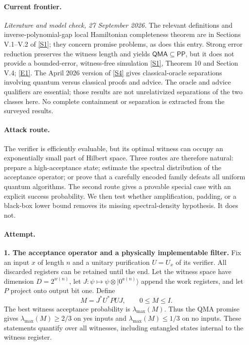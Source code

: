 \documentclass[11pt,a4paper]{article}
\newcommand{\sref}[2]{\hyperlink{source:#1:#2}{[S#2]}}
\newcommand{\eref}[2]{\hyperlink{extra:#1:#2}{[E#2]}}
\numberwithin{equation}{section}
\begin{document}
\paragraph{Current frontier.}
\textit{Literature and model check, 27 September 2026.}
The relevant definitions and inverse-polynomial-gap local Hamiltonian
completeness theorem are in Sections V.1--V.2 of \sref{30006695}{1}; they concern
promise problems, as does this entry. Strong error reduction preserves the
witness length and yields $\mathsf{QMA}\subseteq\mathsf{PP}$, but it does
not provide a bounded-error, witness-free simulation
\sref{30006695}{1}, Theorem 10 and Section V.4; \eref{30006695}{1}.
The April 2026 version of \sref{30006695}{4} gives classical-oracle separations
involving quantum versus classical proofs and advice. The oracle and advice
qualifiers are essential; those results are not unrelativized separations
of the two classes here. No complete containment or separation is extracted
from the surveyed results.

\paragraph{Attack route.}
The verifier is efficiently evaluable, but its optimal witness can occupy
an exponentially small part of Hilbert space. Three routes are therefore
natural: prepare a high-acceptance state; estimate the spectral distribution
of the acceptance operator; or prove that a carefully encoded family defeats
all uniform quantum algorithms. The second route gives a provable special
case with an explicit success probability. We then test whether amplification,
padding, or a black-box lower bound removes its missing spectral-density
hypothesis. It does not.

\paragraph{Attempt.}
\textbf{1. The acceptance operator and a physically implementable filter.}
Fix an input $x$ of length $n$ and a unitary purification $U=U_x$ of its
verifier. All discarded registers can be retained until the end. Let the
witness space have dimension $D=2^{w(n)}$, let
$J:\psi\mapsto\psi\otimes|0^{a(n)}\rangle$ append the work registers,
and let $P$ project onto output bit one. Define
\[
 M=J^*U^*PUJ,\qquad 0\le M\le I.
\]
The best witness acceptance probability is $\lambda_{\max}(M)$. Thus the
QMA promise gives $\lambda_{\max}(M)\ge2/3$ on yes inputs and
$\lambda_{\max}(M)\le1/3$ on no inputs. These statements quantify over
all witnesses, including entangled states internal to the witness register.
\end{document}

